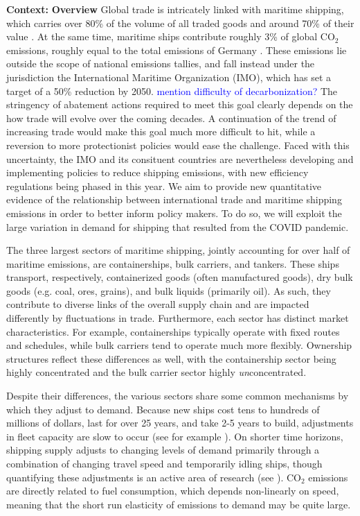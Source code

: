 \documentclass[hidelinks, 12pt,letterpaper]{article}
\begin{document}
\noindent \textbf{Context:} 
\textbf{Overview}
Global trade is intricately linked with maritime shipping, which carries over 80\% of the volume of all traded goods and around 70\% of their value \citep{unctad2017review}. 
At the same time, maritime ships contribute roughly 3\% of global CO$_2$ emissions, roughly equal to the total emissions of Germany \citep*{faber2020fourth}. These emissions lie outside the scope of national emissions tallies, and fall instead under the jurisdiction the International Maritime Organization (IMO), which has set a target of a 50\% reduction by 2050.
\textcolor{blue}{mention difficulty of decarbonization?}
The stringency of abatement actions required to meet this goal clearly depends on the how trade will evolve over the coming decades. A continuation of the trend of increasing trade would make this goal much more difficult to hit, while a reversion to more protectionist policies would ease the challenge. Faced with this uncertainty, the IMO and its consituent countries are nevertheless developing and implementing policies to reduce shipping emissions, with new efficiency regulations being phased in this year. We aim to provide new quantitative evidence of the relationship between international trade and maritime shipping emissions in order to better inform policy makers. To do so, we will exploit the large variation in demand for shipping that resulted from the COVID pandemic.

The three largest sectors of maritime shipping, jointly accounting for over half of maritime emissions, are containerships, bulk carriers, and tankers. These ships transport, respectively,  containerized goods (often manufactured goods), dry bulk goods (e.g. coal, ores, grains), and bulk liquids (primarily oil). As such, they contribute to diverse links of the overall supply chain and are impacted differently by fluctuations in trade. Furthermore, each sector has distinct market characteristics. For example, containerships typically operate with fixed routes and schedules, while bulk carriers tend to operate much more flexibly. Ownership structures reflect these differences as well, with the containership sector being highly concentrated and the bulk carrier sector highly \textit{un}concentrated.

Despite their differences, the various sectors share some common mechanisms by which they adjust to demand. Because new ships cost tens to hundreds of millions of dollars, last for over 25 years, and take 2-5 years to build, adjustments in fleet capacity are slow to occur (see for example \citet{kalouptsidi2014time}). On shorter time horizons, shipping supply adjusts to changing levels of demand primarily through a combination of changing travel speed and temporarily idling ships, though quantifying these adjustments is an active area of research (see \citet*{adland2018dynamic, ollila2022effect,assmann2015missing}). CO$_2$ emissions are directly related to fuel consumption, which depends non-linearly on speed, meaning that the short run elasticity of emissions to demand may be quite large. 
\end{document}
